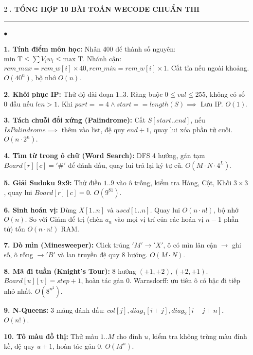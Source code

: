 \documentclass[9pt,a4paper]{article}
\def\labelitemi{$\bullet$}
\renewenvironment{itemize}{%
  \begin{list}{\labelitemi}{%
    \setlength{\topsep}{0pt}%
    \setlength{\partopsep}{0pt}%
    \setlength{\itemsep}{0pt}%
    \setlength{\parsep}{0pt}%
    \setlength{\leftmargin}{10pt}%
  }%
}{\end{list}}
\newcommand{\mysec}[1]{\vspace{2pt}\textbf{\fontsize{9.5}{10.5}\selectfont #1}\vspace{1pt}\hrule\vspace{2pt}}
\begin{document}
\begin{multicols*}{2}
\mysec{5. TỔNG HỢP 10 BÀI TOÁN WECODE CHUẨN THI}
\begin{itemize}
  \item \textbf{1. Tính điểm môn học:} Nhân 400 để thành số nguyên: $\text{min\_T} \le \sum V_i w_i \le \text{max\_T}$. Nhánh cận: $rem\_max = rem\_w[i] \times 40, rem\_min = rem\_w[i] \times 1$. Cắt tỉa nếu ngoài khoảng. $O(40^n)$, bộ nhớ $O(n)$.
  \item \textbf{2. Khôi phục IP:} Thử độ dài đoạn $1..3$. Ràng buộc $0 \le val \le 255$, không có số 0 đầu nếu $len > 1$. Khi $part==4 \land start==length(S) \implies$ Lưu IP. $O(1)$.
  \item \textbf{3. Tách chuỗi đối xứng (Palindrome):} Cắt $S[start..end]$, nếu $IsPalindrome \implies$ thêm vào list, đệ quy $end+1$, quay lui xóa phần tử cuối. $O(n \cdot 2^n)$.
  \item \textbf{4. Tìm từ trong ô chữ (Word Search):} DFS 4 hướng, gán tạm $Board[r][c] = '\#'$ để đánh dấu, quay lui trả lại ký tự cũ. $O(M \cdot N \cdot 4^L)$.
  \item \textbf{5. Giải Sudoku 9x9:} Thử điền $1..9$ vào ô trống, kiểm tra Hàng, Cột, Khối $3 \times 3$, quay lui $Board[r][c]=0$. $O(9^{81})$.
  \item \textbf{6. Sinh hoán vị:} Dùng $X[1..n]$ và $used[1..n]$. Quay lui $O(n \cdot n!)$, bộ nhớ $O(n)$. So với Giảm để trị (chèn $a_n$ vào mọi vị trí của các hoán vị $n-1$ phần tử) tốn $O(n \cdot n!)$ RAM.
  \item \textbf{7. Dò mìn (Minesweeper):} Click trúng $'M' \to 'X'$, ô có mìn lân cận $\to$ ghi số, ô rỗng $\to 'B'$ và lan truyền đệ quy 8 hướng. $O(M \cdot N)$.
  \item \textbf{8. Mã đi tuần (Knight's Tour):} 8 hướng $(\pm 1, \pm 2), (\pm 2, \pm 1)$. $Board[u][v] = step + 1$, hoàn tác gán 0. Warnsdorff: ưu tiên ô có bậc đi tiếp nhỏ nhất. $O(8^{n^2})$.
  \item \textbf{9. N-Queens:} 3 mảng đánh dấu: $col[j], diag_1[i+j], diag_2[i-j+n]$. $O(n!)$.
  \item \textbf{10. Tô màu đồ thị:} Thử màu $1..M$ cho đỉnh $u$, kiểm tra không trùng màu đỉnh kề, đệ quy $u+1$, hoàn tác gán 0. $O(M^n)$.
\end{itemize}

\end{multicols*}
\end{document}
